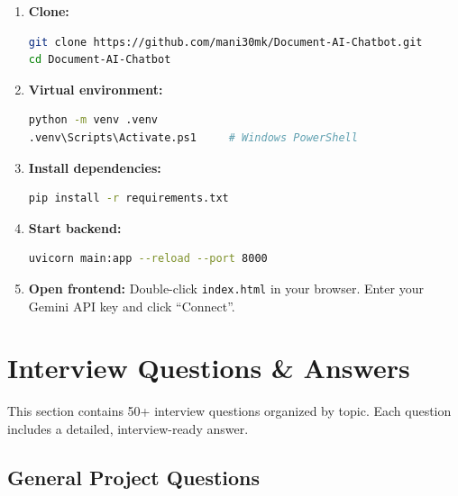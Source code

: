 \documentclass[12pt,a4paper]{article}
\begin{document}
\begin{enumerate}
  \item \textbf{Clone:}
    \begin{lstlisting}[language=bash]
git clone https://github.com/mani30mk/Document-AI-Chatbot.git
cd Document-AI-Chatbot
    \end{lstlisting}

  \item \textbf{Virtual environment:}
    \begin{lstlisting}[language=bash]
python -m venv .venv
.venv\Scripts\Activate.ps1     # Windows PowerShell
    \end{lstlisting}

  \item \textbf{Install dependencies:}
    \begin{lstlisting}[language=bash]
pip install -r requirements.txt
    \end{lstlisting}

  \item \textbf{Start backend:}
    \begin{lstlisting}[language=bash]
uvicorn main:app --reload --port 8000
    \end{lstlisting}

  \item \textbf{Open frontend:} Double-click \texttt{index.html} in your browser. Enter your Gemini API key and click ``Connect''.
\end{enumerate}

\newpage
\section{Interview Questions \& Answers}

This section contains 50+ interview questions organized by topic. Each question includes a detailed, interview-ready answer.

\subsection{General Project Questions}
\end{document}
